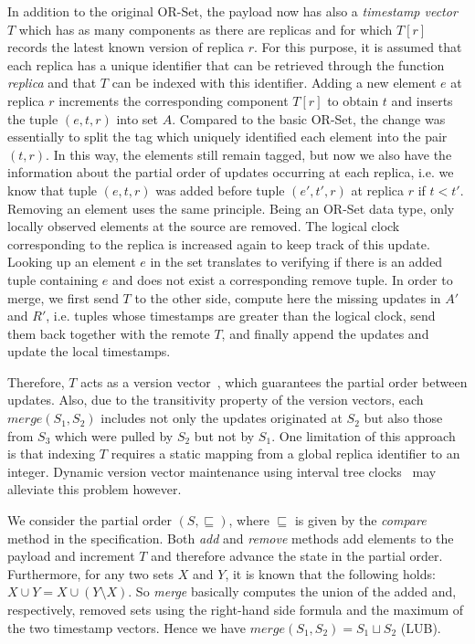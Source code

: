 In addition to the original OR-Set, the payload now has also a \textit{timestamp
vector} $T$ which has as many components as there are replicas and for which
$T[r]$ records the latest known version of replica $r$. For this purpose, it is
assumed that each replica has a unique identifier that can be retrieved through
the function \textit{replica} and that $T$ can be indexed with this identifier.
Adding a new element $e$ at replica $r$ increments the corresponding component
$T[r]$ to obtain $t$ and inserts the tuple $(e, t, r)$ into set $A$. Compared to
the basic OR-Set, the change was essentially to split the tag which uniquely
identified each element into the pair $(t, r)$. In this way, the elements still
remain tagged, but now we also have the information about the partial order of
updates occurring at each replica, i.e. we know that tuple $(e, t, r)$ was added
before tuple $(e', t', r)$ at replica $r$ if $t < t'$. Removing an element uses
the same principle. Being an OR-Set data type, only locally observed elements at
the source are removed. The logical clock corresponding to the replica is
increased again to keep track of this update. Looking up an element $e$ in the
set translates to verifying if there is an added tuple containing $e$ and does
not exist a corresponding remove tuple. In order to merge, we first send $T$ to
the other side, compute here the missing updates in $A'$ and $R'$, i.e. tuples
whose timestamps are greater than the logical clock, send them back together
with the remote $T$, and finally append the updates and update the local
timestamps. 

Therefore, $T$ acts as a version vector~\cite{Parker:1983:DMI:1313337.1313753},
which guarantees the partial order between updates. Also, due to the
transitivity property of the version vectors, each $\textit{merge}(S_{1},
S_{2})$ includes not only the updates originated at $S_{2}$ but also those from
$S_{3}$ which were pulled by $S_{2}$ but not by $S_{1}$. One limitation of this
approach is that indexing $T$ requires a static mapping from a global replica
identifier to an integer. Dynamic version vector maintenance using interval tree
clocks~\cite{Almeida:2008:ITC:1496310.1496330} may alleviate this problem
however.

\begin{IEEEproof} 
We consider the partial order $(S, \sqsubseteq)$, where $\sqsubseteq$ is given
by the \textit{compare} method in the specification. Both \textit{add} and
\textit{remove} methods add elements to the payload and increment $T$ and
therefore advance the state in the partial order. Furthermore, for any two sets
$X$ and $Y$, it is known that the following holds: $X \cup Y = X \cup (Y
\setminus X)$. So \textit{merge} basically computes the union of the added and,
respectively, removed sets using the right-hand side formula and the maximum of
the two timestamp vectors. Hence we have $\textit{merge}(S_{1}, S_{2}) = S_{1}
\sqcup S_{2}$ (LUB).
\end{IEEEproof}